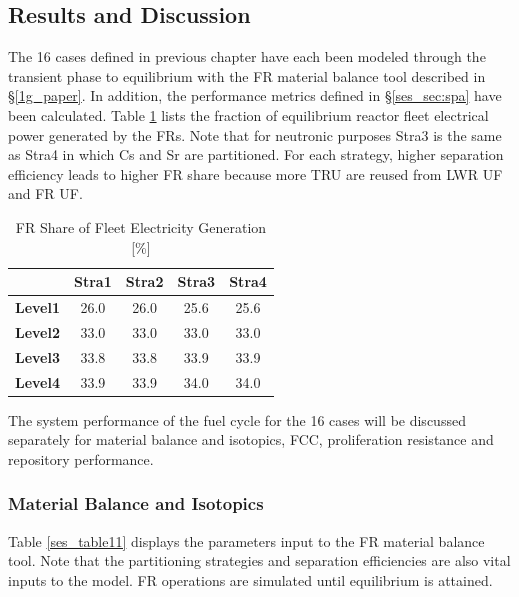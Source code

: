 \subsection{Results and Discussion}
\label{ses_sec:res_disc}
The 16 cases defined in previous chapter have each been modeled through
the transient phase to equilibrium with the FR material balance tool
described in \S \ref{1g_paper}.  In addition, the performance metrics defined
in \S \ref{ses_sec:spa} have been calculated.  Table \ref{ses_table10} lists the fraction of
equilibrium reactor fleet electrical power generated by the FRs.  Note
that for neutronic purposes Stra3 is the same as Stra4 in which Cs and
Sr are partitioned.  For each strategy, higher separation efficiency
leads to higher FR share because more TRU are reused from LWR UF and FR
UF.  

\begin{table}[htbp]
\begin{center}
\caption{FR Share of Fleet Electricity Generation [\%]}
\label{ses_table10}
\begin{tabular}{|l|c|c|c|c|}
\hline
                & \textbf{Stra1} & \textbf{Stra2} & \textbf{Stra3} & \textbf{Stra4} \\
\hline
\textbf{Level1} & 26.0           & 26.0           & 25.6           & 25.6 \\
\textbf{Level2} & 33.0           & 33.0           & 33.0           & 33.0 \\
\textbf{Level3} & 33.8           & 33.8           & 33.9           & 33.9 \\
\textbf{Level4} & 33.9           & 33.9           & 34.0           & 34.0 \\
\hline
\end{tabular}
\end{center}
\end{table}

The system performance of the fuel cycle for the 16 cases will be
discussed separately for material balance and isotopics, FCC,
proliferation resistance and repository performance.


\subsubsection{Material Balance and Isotopics}
\label{ses_sec:mat_balance}
Table \ref{ses_table11} displays the parameters input to the FR material balance tool.
Note that the partitioning strategies and separation efficiencies are
also vital inputs to the model.  FR operations are simulated until
equilibrium is attained.

